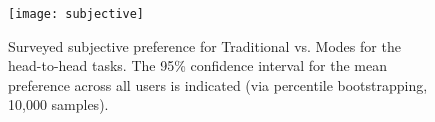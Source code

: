 \begin{figure}
\texttt{[image: subjective]}
\caption{Surveyed subjective preference for Traditional vs. \deuce{} Modes for the head-to-head tasks.
The 95\% confidence interval for the mean preference across all users is indicated (via percentile bootstrapping, 10,000 samples).}
\label{fig:subjective}
\end{figure}
